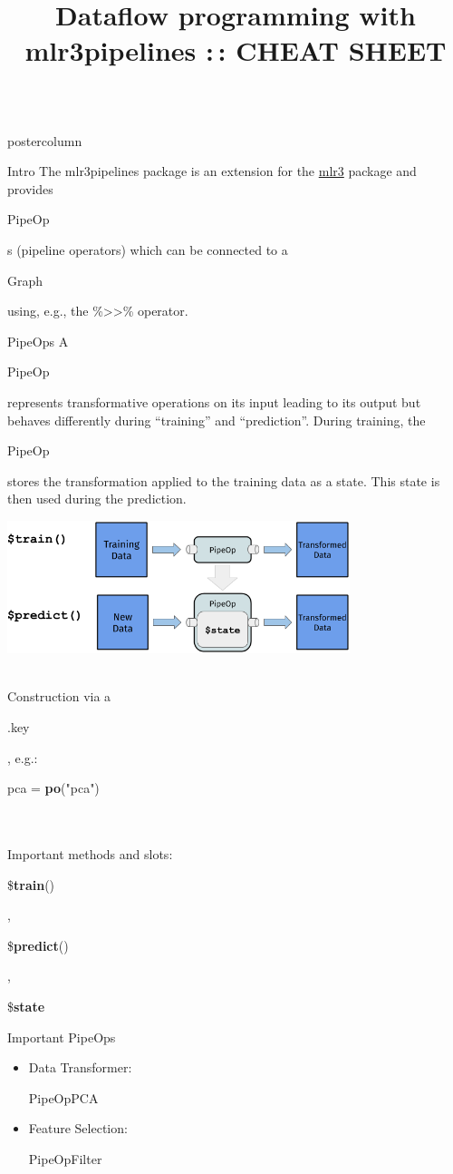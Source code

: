 \documentclass{beamer}
\title{Dataflow programming with mlr3pipelines :\,: CHEAT SHEET} %
\newlength{\columnheight} %
\newcommand{\codeinline}[1]{\begin{codeboxinline}#1\end{codeboxinline}}
\begin{document}
\begin{frame}[fragile]{}
	\begin{columns}
		\begin{column}{.245\textwidth}
			\begin{beamercolorbox}[center]{postercolumn}
				\begin{minipage}{.98\textwidth}
					\parbox[t][\columnheight]{\textwidth}{
						\begin{myblock}{Intro}
              The mlr3pipelines package is an extension for the \href{https://github.com/mlr-org/mlr3}{mlr3} package and provides \codeinline{PipeOp}s (pipeline operators) which can be connected to a \codeinline{Graph} using, e.g., the \%>{}>\% operator.
            \end{myblock}
						\begin{myblock}{PipeOps}
              A \codeinline{PipeOp} represents transformative operations on its input leading to its output but behaves differently during ``training'' and ``prediction''. During training, the \codeinline{PipeOp} stores the transformation applied to the training data as a state. This state is then used during the prediction.
              \begin{center}
                \includegraphics[width=0.75\textwidth]{img/po.png}
              \end{center}
              \ \\
              Construction via a \codeinline{.key}, e.g.: \codeinline{pca = \textbf{po}("pca")}\\
              \ \\
              Important methods and slots:\\
              \codeinline{\$\textbf{train}()}, \codeinline{\$\textbf{predict}()}, \codeinline{\$\textbf{state}}
						\end{myblock}
            \begin{myblock}{Important PipeOps}
              \begin{itemize}
                \item Data Transformer: \codeinline{PipeOpPCA}
                \item Feature Selection: \codeinline{PipeOpFilter}

\end{itemize}
\end{myblock}}
\end{minipage}
\end{beamercolorbox}
\end{column}
\end{columns}
\end{frame}
\end{document}
